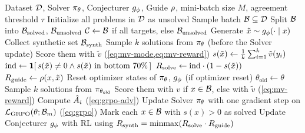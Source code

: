 \begin{algorithm}[tb]
  \caption{SGS-GRPO with majority-vote rewards (on-policy Solver update)}
  \label{alg:sgs-grpo-mv}
  \begin{algorithmic}[1]
     Dataset $\mathcal{D}$, Solver $\pi_\theta$, Conjecturer $g_\phi$, Guide $\rho$, mini-batch size $M$, agreement threshold $\tau$
    \STATE Initialize all problems in $\mathcal{D}$ as unsolved
      \STATE Sample batch $\mathcal{B} \subseteq \mathcal{D}$
      \STATE Split $\mathcal{B}$ into $\mathcal{B}_{\mathrm{solved}}$, $\mathcal{B}_{\mathrm{unsolved}}$
      \STATE $\mathcal{C} \leftarrow \mathcal{B}$ if all targets, else $\mathcal{B}_{\mathrm{unsolved}}$
        \STATE Generate $\tilde{x} \sim g_\phi(\cdot \mid x)$
      \ENDFOR
      \STATE Collect synthetic set $\mathcal{B}_{\mathrm{synth}}$
        \STATE Sample $k$ solutions from $\pi_\theta$ (before the Solver update)
        \STATE Score them with $\tilde{v}$ (\cref{eq:mv-mode,eq:mv-reward})
        \STATE $s(\tilde{x}) \leftarrow \frac{1}{k}\sum_{i=1}^{k} \tilde{v}(y_i)$
        \STATE $\text{ind} \leftarrow \mathbf{1}[\, s(\tilde{x}) \neq 0 \land s(\tilde{x}) \text{ in bottom } 70\% \,]$
        \STATE $R_{\text{solve}} \leftarrow \text{ind} \cdot (1 - s(\tilde{x}))$
        \STATE $R_{\text{guide}} \leftarrow \rho(x, \tilde{x})$
      \ENDFOR
      \STATE Reset optimizer states of $\pi_\theta$, $g_\phi$ (if optimizer reset)
        \STATE $\theta_{\mathrm{old}} \leftarrow \theta$
          \STATE Sample $k$ solutions from $\pi_{\theta_{\mathrm{old}}}$
          \STATE Score them with $v$ if $x \in \mathcal{B}$, else with $\tilde{v}$ (\cref{eq:mv-reward})
          \STATE Compute $\hat{A}_i$ (\cref{eq:grpo-adv})
        \ENDFOR
        \STATE Update Solver $\pi_\theta$ with one gradient step on $\mathcal{L}_{\mathrm{GRPO}}(\theta; \mathcal{B}_m)$ (\cref{eq:grpo})
      \ENDFOR
      \STATE Mark each $x \in \mathcal{B}$ with $s(x) > 0$ as solved
      \STATE Update Conjecturer $g_\phi$ with RL using $R_{\text{synth}} = \operatorname{minmax}(R_{\text{solve}} \cdot R_{\text{guide}})$
    \ENDFOR
  \end{algorithmic}
\end{algorithm}

